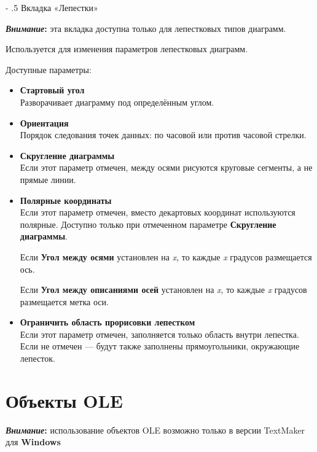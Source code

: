 ﻿\documentclass[a4paper,10pt]{article}
\makeatletter
\renewcommand\paragraph{%
   \@startsection{paragraph}{4}{0mm}%
      {-\baselineskip}%
      {.5\baselineskip}%
      {\normalfont\normalsize\bfseries}}
\makeatother
\begin{document}
\paragraph{Вкладка «Лепестки»}
\begin{mdframed}[backgroundcolor=blue!10]
\textbf{\textit{Внимание}:}  эта вкладка доступна только для лепестковых типов диаграмм.
\end{mdframed}

Используется для изменения параметров лепестковых диаграмм.

Доступные параметры:
\begin{itemize}
 \item \textbf{Стартовый угол}\\
 Разворачивает диаграмму под определённым углом.
 \item \textbf{Ориентация}\\
 Порядок следования точек данных: по часовой или против часовой стрелки.
 \item \textbf{Скругление диаграммы}\\
 Если этот параметр отмечен, между осями рисуются круговые сегменты, а не прямые линии.
 \item \textbf{Полярные координаты}\\
 Если этот параметр отмечен, вместо декартовых координат используются полярные. Доступно только при отмеченном параметре \textbf{Скругление диаграммы}.
 
 Если \textbf{Угол между осями} установлен на \textit{x}, то каждые \textit{x} градусов размещается ось.
 
 Если \textbf{Угол между описаниями осей} установлен на \textit{x}, то каждые \textit{x} градусов размещается метка оси.
 \item \textbf{Ограничить область прорисовки лепестком}\\
 Если этот параметр отмечен, заполняется только область внутри лепестка. Если не отмечен — будут также заполнены прямоугольники, окружающие лепесток. 
\end{itemize}

\section{Объекты OLE} \label{sec:объектыоле}
\begin{mdframed}[backgroundcolor=blue!10]
\textbf{\textit{Внимание}:} использование объектов OLE возможно только в версии TextMaker для \textbf{Windows}
\end{mdframed}
\end{document}
